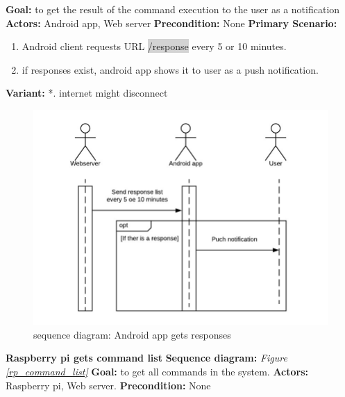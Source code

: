 \documentclass[12pt, oneside, a4paper]{book}
\newcommand{\code}[1]{{\color{red}\colorbox{lightgray}{#1}}}
\newcommand\boldcolor[1]{\textcolor{bold}{\textbf{#1}}}
\begin{document}
				\newline\textbf{Goal:} to get the result of the command execution to the user as a notification
				\newline\textbf{Actors:} Android app, Web server
				\newline\textbf{Precondition:} None
				\newline\textbf{Primary Scenario:}	
				\begin{enumerate}[label*=\arabic*.]
					\item Android client requests URL \code{/response} every 5 or 10 minutes.
					\item if responses exist, android app shows it to user as a push notification.
				\end{enumerate}
				\textbf{Variant:}\newline
				\hspace*{5mm}*. internet might disconnect\\
				\begin{figure}[H]
					\includegraphics[width=\linewidth]{img/sequence_android_response.jpg}
					\caption{sequence diagram: Android app gets responses}
					\label{android_response}
				\end{figure}
				\newpage\hspace*{-6mm}\boldcolor{Raspberry pi gets command list}
				\newline\textbf{Sequence diagram:} \textit{Figure \ref{rp_command_list}}
				\newline\textbf{Goal:} to get all commands in the system.
				\newline\textbf{Actors:} Raspberry pi, Web server.
				\newline\textbf{Precondition:} None
\end{document}
